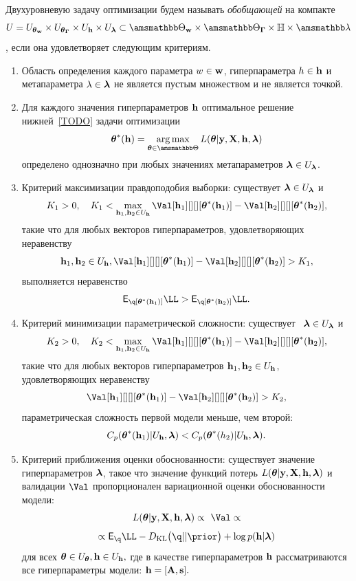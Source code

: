\begin{defin}
Двухуровневую задачу оптимизации будем называть \textit{обобщающей} на компакте $$U = \Utetaw \times \UtetaG \times \Uh \times \Ulam \subset \Tetawb \times \TetaGb \times \Hb \times \Lamb$$, если она удовлетворяет следующим критериям.
\begin{enumerate}
\item Область определения каждого параметра $w \in \mathbf{w}$, гиперпараметра $h \in \mathbf{h}$ и метапараметра $\lambda \in \boldsymbol{\lambda}$ не  является пустым множеством и не является точкой.
\item Для каждого значения гиперпараметров $\mathbf{h}$ оптимальное решение нижней~\eqref{TODO} задачи оптимизации 
\[
\teta^{*}(\h) = \argmax_{\teta \in \Tetab} \Loss
\]
определено однозначно при любых значениях метапараметров $\boldsymbol{\lambda} \in U_{\boldsymbol{\lambda}}$.

\item Критерий максимизации правдоподобия выборки: существует $\boldsymbol{\lambda} \in U_{\boldsymbol{\lambda}}$ и  $$K_1>0, \quad K_1 < \max_{\h_1,\h_2 \in \Uh} \Val[\h_1][][][\teta^{*}(\h_1)] - \Val[\h_2][][][\teta^{*}(\h_2)],$$ такие что для любых векторов гиперпараметров, удовлетворяющих неравенству $$\h_1, \h_2 \in \Uh, \Val[\h_1][][][\teta^{*}(\h_1)] - \Val[\h_2][][][\teta^{*}(\h_2)] > K_1,$$ выполняется неравенство $$\E_{\q[\teta^{*}(\h_1)]}\LL > \E_{\q[\teta^{*}(\h_2)]}\LL.$$

\item Критерий минимизации параметрической сложности:  существует  $\boldsymbol{\lambda} \in U_{\boldsymbol{\lambda}}$ и $$K_2>0, \quad K_2 < \max_{\h_1, \h_2 \in \Uh} \Val[\h_1][][][\teta^{*}(\h_1)] - \Val[\h_2][][][\teta^{*}(\h_2)],$$ такие что для любых векторов гиперпараметров $\mathbf{h}_1,\mathbf{h}_2 \in U_{\mathbf{h}}$, удовлетворяющих неравенству $$\Val[\h_1][][][\teta^{*}(\h_1)] - \Val[\h_2][][][\teta^{*}(\h_2)]>K_2,$$ параметрическая сложность первой модели меньше, чем второй: $$C_p(\boldsymbol{\theta}^{*}(\mathbf{h}_1)|U_{\mathbf{h}},\boldsymbol{\lambda})<C_p(\boldsymbol{\theta}^{*}(h_2)|U_{\mathbf{h}},\boldsymbol{\lambda}).$$

\item Критерий приближения оценки обоснованности: существует значение гиперпараметров $\boldsymbol{\lambda}$, такое что значение функций потерь $L(\boldsymbol{\theta} |\mathbf{y},\mathbf{X},\mathbf{h},\boldsymbol{\lambda})$ и валидации $\Val$ пропорционален вариационной оценки обоснованности модели: $$\Loss \propto  \Val \propto $$
$$\propto
\E_{\q}\LL - \KL{\q}{\prior} + \log\priorh$$ для всех $\boldsymbol{\theta} \in U_{\boldsymbol{\theta}}, \mathbf{h} \in U_{\mathbf{h}},$
где в качестве гиперпараметров $\mathbf{h}$ рассматриваются все гиперпараметры модели: $\mathbf{h} = [\mathbf{A}, \mathbf{s}].$ 


\end{enumerate}
\end{defin}
